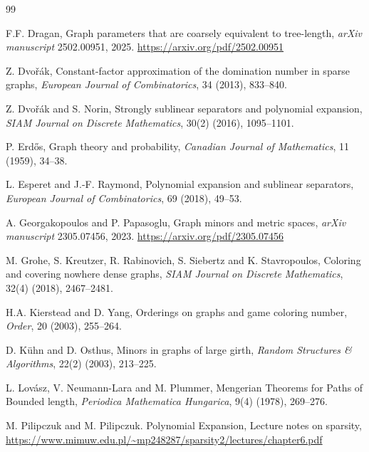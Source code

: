 \documentclass[final]{dmtcs-episciences}
\theoremstyle{definition}
\theoremstyle{remark}
\begin{document}
\nocite{*}


\begin{thebibliography}{99}

 F.F. Dragan,  Graph parameters that are coarsely equivalent to tree-length, \emph{arXiv manuscript} 2502.00951, 2025. \url{https://arxiv.org/pdf/2502.00951}


 Z. Dvo\v{r}\'ak, Constant-factor approximation of the domination number in sparse graphs, \emph{European
Journal of Combinatorics}, 34 (2013), 833--840.

 Z. Dvo\v{r}\'ak and S. Norin, Strongly sublinear separators and polynomial expansion, \emph{SIAM Journal on Discrete Mathematics}, 30(2) (2016), 1095--1101.
          


     P. Erd\H{o}s, Graph theory and probability, \emph{Canadian Journal of  Mathematics}, 11 (1959), 34--38.


 L. Esperet and J.-F. Raymond, Polynomial expansion and sublinear separators, \emph{European Journal of Combinatorics}, 69 (2018),  49--53.

 A. Georgakopoulos and P. Papasoglu, Graph minors and metric spaces, \emph{arXiv manuscript} 2305.07456, 2023. \url{https://arxiv.org/pdf/2305.07456}


 M. Grohe, S. Kreutzer, R. Rabinovich, S. Siebertz and K. Stavropoulos, Coloring and covering nowhere dense graphs, \emph{SIAM Journal on Discrete Mathematics}, 32(4) (2018), 2467--2481.

 H.A. Kierstead and D. Yang, Orderings on graphs and game coloring number, \emph{Order}, 20 (2003), 255--264.

 D. K\"{u}hn and D. Osthus, Minors in graphs of large girth, \emph{Random Structures \& Algorithms}, {22(2)} (2003), 213--225.

 L. Lov\'asz, V. Neumann-Lara and M. Plummer, Mengerian Theorems for Paths of Bounded length, \emph{Periodica Mathematica Hungarica}, {9(4)} (1978), 269--276.

M. Pilipczuk and M. Pilipczuk. Polynomial Expansion, Lecture notes on sparsity, \url{https://www.mimuw.edu.pl/~mp248287/sparsity2/lectures/chapter6.pdf} 


\end{thebibliography}
\end{document}
